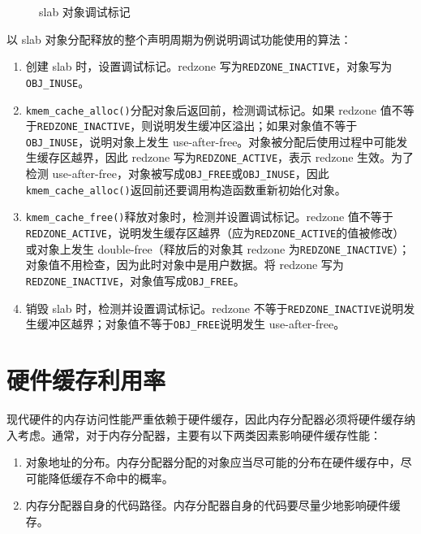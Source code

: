 \documentclass[AutoFakeBold]{LZUThesis}
\begin{document}
\begin{sloppypar}
\begin{figure}[htb]
\centering

\caption{slab 对象调试标记}
\label{figure:slab-obj-debug-mark}
\end{figure}

以 slab 对象分配释放的整个声明周期为例说明调试功能使用的算法：

\begin{enumerate}
\def\labelenumi{\arabic{enumi}.}
\item
  创建 slab 时，设置调试标记。redzone
  写为\texttt{REDZONE\_INACTIVE}，对象写为\texttt{OBJ\_INUSE}。
\item
  \texttt{kmem\_cache\_alloc()}分配对象后返回前，检测调试标记。如果
  redzone
  值不等于\texttt{REDZONE\_INACTIVE}，则说明发生缓冲区溢出；如果对象值不等于\texttt{OBJ\_INUSE}，说明对象上发生
  use-after-free。对象被分配后使用过程中可能发生缓存区越界，因此 redzone
  写为\texttt{REDZONE\_ACTIVE}，表示 redzone 生效。为了检测
  use-after-free，对象被写成\texttt{OBJ\_FREE}或\texttt{OBJ\_INUSE}，因此\texttt{kmem\_cache\_alloc()}返回前还要调用构造函数重新初始化对象。
\item
  \texttt{kmem\_cache\_free()}释放对象时，检测并设置调试标记。redzone
  值不等于\texttt{REDZONE\_ACTIVE}，说明发生缓存区越界（应为\texttt{REDZONE\_ACTIVE}的值被修改）或对象上发生
  double-free（释放后的对象其 redzone
  为\texttt{REDZONE\_INACTIVE}）；对象值不用检查，因为此时对象中是用户数据。将
  redzone 写为\texttt{REDZONE\_INACTIVE}，对象值写成\texttt{OBJ\_FREE}。
\item
  销毁 slab 时，检测并设置调试标记。redzone
  不等于\texttt{REDZONE\_INACTIVE}说明发生缓冲区越界；对象值不等于\texttt{OBJ\_FREE}说明发生
  use-after-free。
\end{enumerate}


\section{硬件缓存利用率}\label{sec:hw-cache-efficiency}

现代硬件的内存访问性能严重依赖于硬件缓存，因此内存分配器必须将硬件缓存纳入考虑。通常，对于内存分配器，主要有以下两类因素影响硬件缓存性能：

\begin{enumerate}
\def\labelenumi{\arabic{enumi}.}
\item
  对象地址的分布。内存分配器分配的对象应当尽可能的分布在硬件缓存中，尽可能降低缓存不命中的概率。
\item
  内存分配器自身的代码路径。内存分配器自身的代码要尽量少地影响硬件缓存。
\end{enumerate}


\end{sloppypar}
\end{document}
